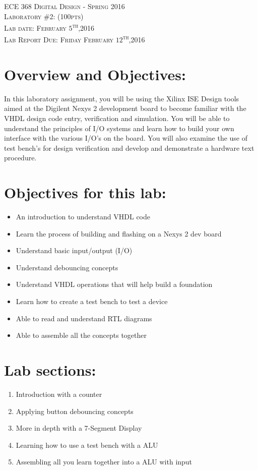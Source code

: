 \documentclass{article}
\begin{document}
\begin{center}
\textsc{\huge ECE 368 Digital Design - Spring 2016}\\[1cm]
\textsc{{\LARGE Laboratory \#2: (100pts)}}\\[0.5cm]
\textsc{\Large Lab date: February $5$\textsuperscript{th},2016}\\[0.5cm]
\textsc{\Large Lab Report Due: Friday February $12$\textsuperscript{th},2016}\\[1cm]
\end{center}

\section{Overview and Objectives:}
In this laboratory assignment, you will be using the Xilinx ISE Design tools aimed at the Digilent Nexys 2 development board to become familiar with the VHDL design code entry, verification and simulation. You will be able to understand the principles of I/O systems and learn how to build your own interface with the various I/O's on the board. You will also examine the use of test bench's for design verification and develop and demonstrate a hardware text procedure.

\section{Objectives for this lab:}
\begin{itemize}
  \item An introduction to understand VHDL code
  \item Learn the process of building and flashing on a Nexys 2 dev board
  \item Understand basic input/output (I/O)
  \item Understand debouncing concepts
  \item Understand VHDL operations that will help build a foundation
  \item Learn how to create a test bench to test a device
  \item Able to read and understand RTL diagrams
  \item Able to assemble all the concepts together
\end{itemize}

\section{Lab sections:}
\begin{enumerate}
  \item Introduction with a counter
  \item Applying button debouncing concepts
  \item More in depth with a 7-Segment Display
  \item Learning how to use a test bench with a ALU
  \item Assembling all you learn together into a ALU with input
\end{enumerate}
\end{document}

